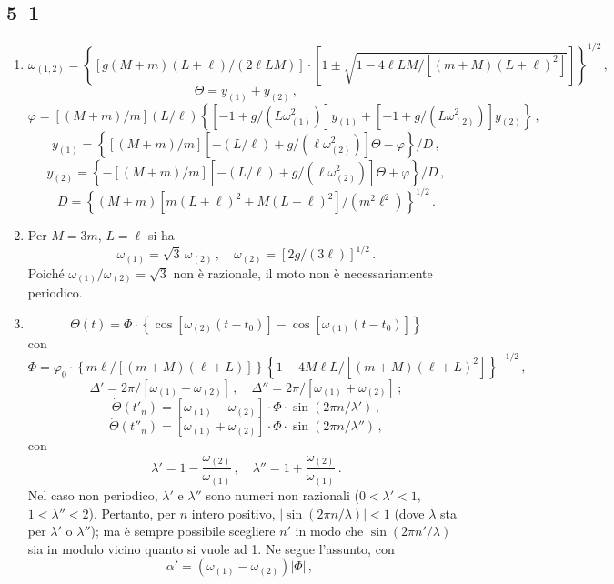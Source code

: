 \documentclass[11pt, a4paper]{book}
\numberwithin{equation}{section}
\begin{document}
\subsection*{5--1}
\begin{enumerate}
    \item
    \[
        \omega_{(1,2)} = \left\{ [g(M+m)(L+\ell)/(2\ell LM)]
        \cdot \left[ 1 \pm \sqrt{1 - 4\ell LM/[(m+M)(L+\ell)^2]} \right]
        \right\}^{1/2} \,,
    \]
    \[
        \Theta = y_{(1)} + y_{(2)} \,,
    \]
    \[
        \varphi = \left[(M+m)/m\right](L/\ell)
        \left\{ \left[-1+g/(L\omega_{(1)}^2)\right]y_{(1)}
        + \left[-1+g/(L\omega_{(2)}^2)\right]y_{(2)} \right\} \,,
    \]
    \[
        y_{(1)} = \left\{[(M+m)/m][-(L/\ell)+g/(\ell\omega_{(2)}^2)]\Theta
        - \varphi\right\}/D \,,
    \]
    \[
        y_{(2)} = \left\{-[(M+m)/m][-(L/\ell)+g/(\ell\omega_{(2)}^2)]\Theta
        + \varphi\right\}/D \,,
    \]
    \[
        D = \left\{(M+m)\left[m(L+\ell)^2 + M(L-\ell)^2\right]/(m^2\ell^2)
        \right\}^{1/2} \,.
    \]
    \item Per $M=3m$, $L=\ell$ si ha
    \[
        \omega_{(1)} = \sqrt{3}\,\omega_{(2)}\,, \quad
        \omega_{(2)} = [2g/(3\ell)]^{1/2} \,.
    \]
    Poiché $\omega_{(1)}/\omega_{(2)} = \sqrt{3}$ non è razionale, il moto non è
    necessariamente periodico.
    \item
    \[
        \Theta(t) = \Phi \cdot \left\{\cos[\omega_{(2)}(t-t_0)]
        - \cos[\omega_{(1)}(t-t_0)]\right\}
    \]
    con
    \[
        \Phi = \varphi_0 \cdot \left\{m\ell/[(m+M)(\ell+L)]\right\}
        \left\{1 - 4M\ell L/[(m+M)(\ell+L)^2]\right\}^{-1/2} \,,
    \]
    \[
        \Delta' = 2\pi/[\omega_{(1)}-\omega_{(2)}]\,, \quad
        \Delta'' = 2\pi/[\omega_{(1)}+\omega_{(2)}] \,;
    \]
    \[
        \dot{\Theta}(t'_n) = [\omega_{(1)}-\omega_{(2)}]\cdot\Phi\cdot\sin(2\pi n/\lambda') \,,
    \]
    \[
        \dot{\Theta}(t''_n) = [\omega_{(1)}+\omega_{(2)}]\cdot\Phi\cdot\sin(2\pi n/\lambda'') \,,
    \]
    con
    \[
        \lambda' = 1 - \frac{\omega_{(2)}}{\omega_{(1)}}\,, \quad
        \lambda'' = 1 + \frac{\omega_{(2)}}{\omega_{(1)}} \,.
    \]
    Nel caso non periodico, $\lambda'$ e $\lambda''$ sono numeri non razionali
    ($0 < \lambda' < 1$, $1 < \lambda'' < 2$). Pertanto, per $n$ intero positivo,
    $|\sin(2\pi n/\lambda)| < 1$ (dove $\lambda$ sta per $\lambda'$ o $\lambda''$);
    ma è sempre possibile scegliere $n'$ in modo che
    $\sin(2\pi n'/\lambda)$ sia in modulo vicino quanto si vuole ad 1. Ne segue
    l'assunto, con
    \[
        \alpha' = (\omega_{(1)}-\omega_{(2)})|\Phi|\,, \quad
\]
\end{enumerate}
\end{document}
